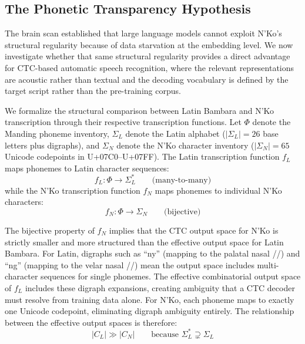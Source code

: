 \documentclass[11pt]{article}
\newcommand{\nko}{N'Ko}
\begin{document}
\subsection{The Phonetic Transparency Hypothesis}
\label{sec:transparency}

The brain scan established that large language models cannot exploit \nko{}'s structural regularity because of data starvation at the embedding level. We now investigate whether that same structural regularity provides a direct advantage for CTC-based automatic speech recognition, where the relevant representations are acoustic rather than textual and the decoding vocabulary is defined by the target script rather than the pre-training corpus.

We formalize the structural comparison between Latin Bambara and \nko{} transcription through their respective transcription functions. Let $\Phi$ denote the Manding phoneme inventory, $\Sigma_L$ denote the Latin alphabet ($|\Sigma_L| = 26$ base letters plus digraphs), and $\Sigma_N$ denote the \nko{} character inventory ($|\Sigma_N| = 65$ Unicode codepoints in U+07C0--U+07FF). The Latin transcription function $f_L$ maps phonemes to Latin character sequences:
\begin{equation}
f_L: \Phi \to \Sigma_L^* \qquad \text{(many-to-many)}
\label{eq:latin_map}
\end{equation}
while the \nko{} transcription function $f_N$ maps phonemes to individual \nko{} characters:
\begin{equation}
f_N: \Phi \to \Sigma_N \qquad \text{(bijective)}
\label{eq:nko_map}
\end{equation}

The bijective property of $f_N$ implies that the CTC output space for \nko{} is strictly smaller and more structured than the effective output space for Latin Bambara. For Latin, digraphs such as ``ny'' (mapping to the palatal nasal //) and ``ng'' (mapping to the velar nasal //) mean the output space includes multi-character sequences for single phonemes. The effective combinatorial output space of $f_L$ includes these digraph expansions, creating ambiguity that a CTC decoder must resolve from training data alone. For \nko{}, each phoneme maps to exactly one Unicode codepoint, eliminating digraph ambiguity entirely. The relationship between the effective output spaces is therefore:
\begin{equation}
|C_L| \gg |C_N| \qquad \text{because } \Sigma_L^* \supsetneq \Sigma_L
\label{eq:output_space}
\end{equation}
\end{document}
